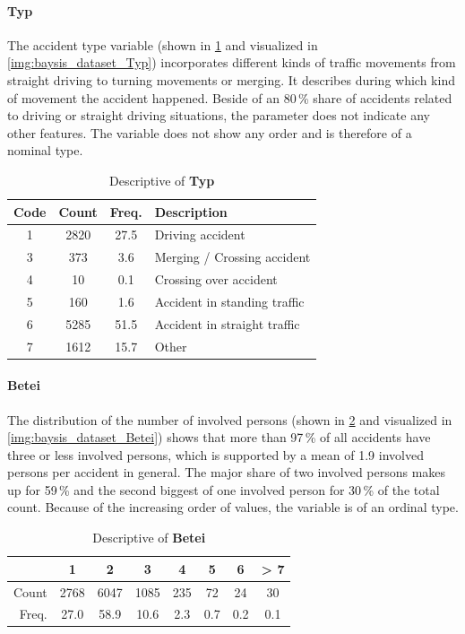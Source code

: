 \paragraph{Typ}
\label{baysis_dataset_Typ}
The accident type variable (shown in \cref{tbl:baysis_dataset_Typ} and visualized in \cref{img:baysis_dataset_Typ}) incorporates different kinds of traffic movements from straight driving to turning movements or merging. It describes during which kind of movement the accident happened. Beside of an 80\,\% share of accidents related to driving or straight driving situations, the parameter does not indicate any other features. The variable does not show any order and is therefore of a nominal type.
\begin{table}[!ht]
	\centering
	\small
	\begin{tabular}{c|c|c|l} 
		\toprule
		Code & Count & Freq. & Description \\ 
		\midrule
 		1 & 2820	& 27.5	& Driving accident \\ 
 		3 & 373		& 3.6 	& Merging / Crossing accident \\
 		4 & 10		& 0.1	& Crossing over accident \\
 		5 & 160 	& 1.6	& Accident in standing traffic \\
 		6 & 5285	& 51.5	& Accident in straight traffic \\
		7 & 1612	& 15.7 	& Other \\
		\bottomrule
	\end{tabular}
	\caption{Descriptive of \textbf{Typ}}
	\label{tbl:baysis_dataset_Typ}
	\vspace{-8mm}
\end{table}
\paragraph{Betei}
\label{baysis_dataset_Betei}
The distribution of the number of involved persons (shown in \cref{tbl:baysis_dataset_Betei} and visualized in \cref{img:baysis_dataset_Betei}) shows that more than 97\,\% of all accidents have three or less involved persons, which is supported by a mean of 1.9 involved persons per accident in general. The major share of two involved persons makes up for 59\,\% and the second biggest of one involved person for 30\,\% of the total count. Because of the increasing order of values, the variable is of an ordinal type.
\begin{table}[!ht]
	\centering
	\small
	\begin{tabular}{r|ccccccc} 
		\toprule
		 			& 1		& 2		& 3		& 4		& 5		& 6  	& > 7\\ 
		\midrule
 		Count 		& 2768	& 6047	& 1085	& 235	& 72 	& 24	& 30 \\ 
 		Freq. 	& 27.0	& 58.9	& 10.6 	& 2.3	& 0.7 	& 0.2 	& 0.1 \\
		\bottomrule
	\end{tabular}
	\caption{Descriptive of \textbf{Betei}}
	\label{tbl:baysis_dataset_Betei}
	\vspace{-8mm}
\end{table}
